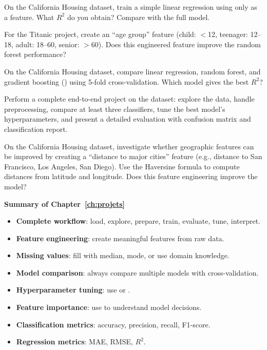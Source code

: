 \begin{exercise}[$\star$]
On the California Housing dataset, train a simple linear regression using only  as a feature. What $R^2$ do you obtain? Compare with the full model.
\end{exercise}

\begin{exercise}[$\star\star$]
For the Titanic project, create an ``age group'' feature (child: $<$12, teenager: 12--18, adult: 18--60, senior: $>$60). Does this engineered feature improve the random forest performance?
\end{exercise}

\begin{exercise}[$\star\star$]
On the California Housing dataset, compare linear regression, random forest, and gradient boosting () using 5-fold cross-validation. Which model gives the best $R^2$?
\end{exercise}

\begin{exercise}[$\star\star\star$]
Perform a complete end-to-end project on the  dataset: explore the data, handle preprocessing, compare at least three classifiers, tune the best model's hyperparameters, and present a detailed evaluation with confusion matrix and classification report.
\end{exercise}

\begin{exercise}[$\star\star\star$]
On the California Housing dataset, investigate whether geographic features can be improved by creating a ``distance to major cities'' feature (e.g., distance to San Francisco, Los Angeles, San Diego). Use the Haversine formula to compute distances from latitude and longitude. Does this feature engineering improve the model?
\end{exercise}

\begin{keyformulas}
\textbf{Summary of Chapter~\ref{ch:projets}}
\begin{itemize}
    \item \textbf{Complete workflow}: load, explore, prepare, train, evaluate, tune, interpret.
    \item \textbf{Feature engineering}: create meaningful features from raw data.
    \item \textbf{Missing values}: fill with median, mode, or use domain knowledge.
    \item \textbf{Model comparison}: always compare multiple models with cross-validation.
    \item \textbf{Hyperparameter tuning}: use  or .
    \item \textbf{Feature importance}: use  to understand model decisions.
    \item \textbf{Classification metrics}: accuracy, precision, recall, F1-score.
    \item \textbf{Regression metrics}: MAE, RMSE, $R^2$.
\end{itemize}
\end{keyformulas}
